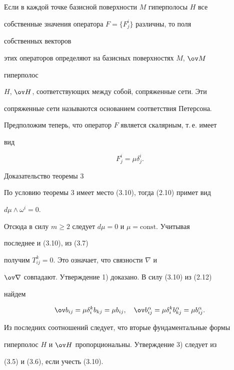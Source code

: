 \begin{cor} 


Если в каждой точке базисной поверхности $M$ гиперполосы $H$ все 


собственные значения оператора $F=\{F^i_j\}$ различны, то поля 


собственных векторов 


этих операторов определяют на базисных поверхностях $M$, $\ov M$ 


гиперполос 


$H$, $\ov H$, соответствующих между собой, сопряженные сети. Эти 


сопряженные сети называются основанием соответствия Петерсона. 


\end{cor} 


 


Предположим теперь, что оператор $F$ является скалярным, т.\,е. имеет 


вид 


\begin{equation} 


F^i_j=\mu\delta^i_j. 


\end{equation} 


 


\begin{pf*}{Доказательство теоремы 3} 


По условию теоремы 3 имеет место (3.10), тогда (2.10) примет вид 


$d\mu\wedge\omega^i=0$. 


Отсюда в силу $m\ge 2$ следует $d\mu=0$ и $\mu=\text{const}$. Учитывая 


последнее и (3.10), из (3.7) 


получим $T^k_{ij}=0$. Это означает, что связности $\nabla$ и 


$\ov\nabla$ совпадают. Утверждение 1) доказано. В силу (3.10) из (2.12) 


найдем 


$$ 


\ov b_{ij}=\mu\delta^k_i b_{kj}=\mu b_{ij},\quad 


\ov b^\alpha_{ij}=\mu\delta^k_i b^\alpha_{kj}= 


\mu b^\alpha_{ij}. 


$$ 


Из последних соотношений следует, что вторые фундаментальные формы 


гиперполос $H$ и $\ov H$ пропорциональны. Утверждение 3) следует из 


(3.5) и (3.6), если учесть (3.10).


\end{pf*} 


